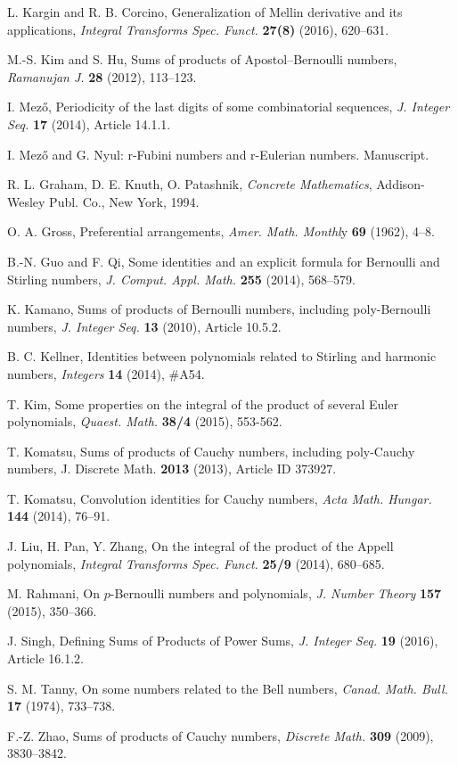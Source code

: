 \documentclass{article}%
\begin{document}
\begin{thebibliography}{99}
L. Kargin and R. B. Corcino, Generalization of Mellin
derivative and its applications, \textit{Integral Transforms Spec. Funct.}
\textbf{27(8)} (2016), 620--631.

M.-S. Kim and S. Hu, Sums of products of Apostol--Bernoulli
numbers, \textit{Ramanujan J.} \textbf{28} (2012), 113--123.

I. Mez\H{o}, Periodicity of the last digits of some
combinatorial sequences, \textit{J. Integer Seq.} \textbf{17} (2014), Article 14.1.1.

I. Mez\H{o} and G. Nyul: r-Fubini numbers and r-Eulerian
numbers. Manuscript.

R. L. Graham, D. E. Knuth, O. Patashnik, \textit{Concrete
Mathematics}, Addison-Wesley Publ. Co., New York, 1994.

O. A. Gross, Preferential arrangements, \textit{Amer. Math.
Monthl}y \textbf{69} (1962), 4--8.

B.-N. Guo and F. Qi, Some identities and an explicit
formula for Bernoulli and Stirling numbers, \textit{J. Comput. Appl. Math.}
\textbf{255 }(2014), 568--579.

K. Kamano, Sums of products of Bernoulli numbers, including
poly-Bernoulli numbers, \textit{J. Integer Seq.} \textbf{13} (2010), Article 10.5.2.

B. C. Kellner, Identities between polynomials related to
Stirling and harmonic numbers, \textit{Integers} \textbf{14 }(2014), \#A54.

T. Kim, Some properties on the integral of the product of
several Euler polynomials, \textit{Quaest. Math.} \textbf{38/4} (2015), 553-562.

T. Komatsu, Sums of products of Cauchy numbers, including
poly-Cauchy numbers, J. Discrete Math. \textbf{2013} (2013), Article ID 373927.

T. Komatsu, Convolution identities for Cauchy numbers,
\textit{Acta Math. Hungar.} \textbf{144} (2014), 76--91.

J. Liu, H. Pan, Y. Zhang, On the integral of the product of the
Appell polynomials, \textit{Integral Transforms Spec. Funct.} \textbf{25/9}
(2014), 680--685.

M. Rahmani, On $p$-Bernoulli numbers and polynomials,
\textit{J. Number Theory} \textbf{157} (2015), 350--366.

J. Singh, Defining Sums of Products of Power Sums, \textit{J.
Integer Seq.} \textbf{19} (2016), Article 16.1.2.

S. M. Tanny, On some numbers related to the Bell numbers,
\textit{Canad. Math. Bull.} \textbf{17} (1974), 733--738.

F.-Z. Zhao, Sums of products of Cauchy numbers,
\textit{Discrete Math.} \textbf{309} (2009), 3830--3842.
\end{thebibliography}
\end{document}
